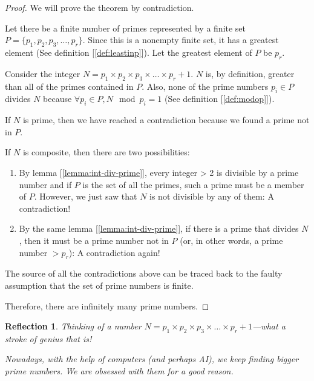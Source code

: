 \documentclass[english,notitlepage,smartquotes]{hgbreport}
\theoremstyle{definition}
\theoremstyle{remark}
\theoremstyle{plain}
\newtheorem{reflection}{Reflection}
\begin{document}
\begin{proof}
We will prove the theorem by contradiction.

Let there be a finite number of primes represented by a finite set $P=\{p_1,p_2,p_3,\dots,p_r\}$. Since this is a nonempty finite set, it has a greatest element (See definition [\ref{def:leastinp}]). Let the greatest element of $P$ be $p_r$.

Consider the integer $N=p_1\times p_2\times p_3\times\dots\times p_r+1$. $N$ is, by definition, greater than all of the primes contained in $P$. Also, none of the prime numbers $p_i\in P$ divides $N$ because $\forall p_i\in P, N\mod p_i=1$ (See definition [\ref{def:modop}]).

If $N$ is prime, then we have reached a contradiction because we found a prime not in $P$.

If $N$ is composite, then there are two possibilities:
\begin{enumerate}
\item By lemma [\ref{lemma:int-div-prime}], every integer > 2 is divisible by a prime number and if $P$ is the set of all the primes, such a prime must be a member of $P$. However, we just saw that $N$ is not divisible by any of them: A contradiction!
\item By the same lemma [\ref{lemma:int-div-prime}], if there is a prime that divides $N$, then it must be a prime number not in $P$ (or, in other words, a prime number $>p_r$): A contradiction again!
\end{enumerate}

The source of all the contradictions above can be traced back to the faulty assumption that the set of prime numbers is finite.

Therefore, there are infinitely many prime numbers.
\end{proof}
\begin{reflection}
Thinking of a number $N=p_1\times p_2\times p_3\times\dots\times p_r+1$---what a stroke of genius that is!

Nowadays, with the help of computers (and perhaps AI), we keep finding bigger prime numbers. We are obsessed with them for a good reason.
\end{reflection}
\end{document}
